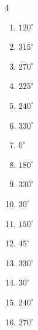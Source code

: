 \begin{multicols}{4}
\begin{enumerate}
  \item $\displaystyle 120^{\circ}$

  \item $\displaystyle 315^{\circ}$

  \item $\displaystyle 270^{\circ}$

  \item $\displaystyle 225^{\circ}$

  \item $\displaystyle 240^{\circ}$

  \item $\displaystyle 330^{\circ}$

  \item $\displaystyle 0^{\circ}$
        \phantom{$\displaystyle =0$}

  \item $\displaystyle 180^{\circ}$
        \phantom{$\displaystyle =\pi$}

  \item $\displaystyle 330^{\circ}$

  \item $\displaystyle 30^{\circ}$

  \item $\displaystyle 150^{\circ}$

  \item $\displaystyle 45^{\circ}$

  \item $\displaystyle 330^{\circ}$

\columnbreak %

  \item $\displaystyle 30^{\circ}$

  \item $\displaystyle 240^{\circ}$

  \item $\displaystyle 270^{\circ}$


\end{enumerate}
\end{multicols}
